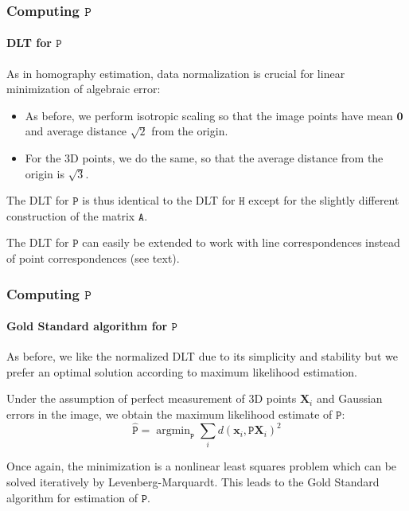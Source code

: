 \documentclass[aspectratio=169]{beamer}
\renewcommand{\vec}[1]{\boldsymbol{#1}}
\newcommand{\mat}[1]{\mathtt{#1}}
\DeclareMathOperator*{\argmin}{argmin}
\begin{document}
\begin{frame}
\frametitle{Computing $\mat{P}$}
\framesubtitle{DLT for $\mat{P}$}

As in homography estimation, \alert{data normalization} is crucial for
linear minimization of algebraic error:
\begin{itemize}
\item As before, we perform isotropic scaling so that the image points
  have mean $\vec{0}$ and average distance $\sqrt{2}$ from the origin.
\item For the 3D points, we do the same, so that the average distance
  from the origin is $\sqrt{3}$.
\end{itemize}

\medskip

The DLT for $\mat{P}$ is thus identical to the DLT for $\mat{H}$
except for the slightly different construction of the matrix
$\mat{A}$.

\medskip

The DLT for $\mat{P}$ can easily be extended to work with line
correspondences instead of point correspondences (see text).

\end{frame}

\begin{frame}
\frametitle{Computing $\mat{P}$}
\framesubtitle{Gold Standard algorithm for $\mat{P}$}

As before, we like the normalized DLT due to its simplicity and
stability but we prefer an \alert{optimal solution} according to
\alert{maximum likelihood estimation}.

\medskip

Under the assumption of \alert{perfect measurement} of 3D points
$\vec{X}_i$ and \alert{Gaussian errors} in the image, we obtain the
maximum likelihood estimate of $\mat{P}$:
\begin{equation*}
\hat{\mat{P}} = \argmin_{\mat{P}} \sum_i
d(\vec{x}_i,\mat{P}\vec{X}_i)^2
\end{equation*}

\medskip

Once again, the minimization is a nonlinear least squares problem
which can be solved iteratively by Levenberg-Marquardt.  This leads to
the Gold Standard algorithm for estimation of $\mat{P}$.

\end{frame}
\end{document}
